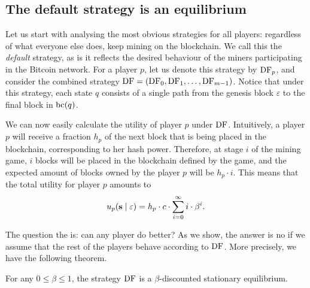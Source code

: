  \subsection{The default strategy is an equilibrium}

Let us start with analysing the most obvious strategies for all players: regardless of what everyone else does, keep mining on the blockchain. We call this 
the \emph{default} strategy, as is it reflects the desired behaviour of the miners participating in the Bitcoin network. 
For a player $p$, let us denote this strategy 
by $\text{\rm DF}_p$, and consider the combined strategy $\text{\rm DF} = (\text{\rm DF}_0,\text{\rm DF}_1,\dots,\text{\rm DF}_{m-1})$. Notice that under this strategy, each state $q$ consists of a single path from the genesis block $\varepsilon$ to the final block in $\text{bc}(q)$.

We can now easily calculate the utility of player $p$ under $\text{\rm DF}$. Intuitively, a player $p$ will receive a fraction $h_p$ of the next block that is being placed in the blockchain, corresponding to her hash power. Therefore, at stage $i$ of the mining game, $i$ blocks will be placed in the blockchain defined by the game, and the expected amount of blocks owned by the player $p$ will be $h_p\cdot i$. This means that the total utility for player $p$ amounts to 
$$u_p(\mathbf{s} \mid \varepsilon) = h_p \cdot c\cdot \sum_{i=0}^{\infty}i \cdot \beta^{i}.$$%


The question the is: can any player do better? As we show, the answer is no if we assume that the rest of the players behave according to $\text{\rm DF}$. More precisely, we have the following theorem.

\begin{mythm}\label{thm-conts_equlibria}
For any $0 \leq \beta \leq 1$, the strategy $\text{\rm DF}$ is a $\beta$-discounted stationary equilibrium.
\end{mythm} 

